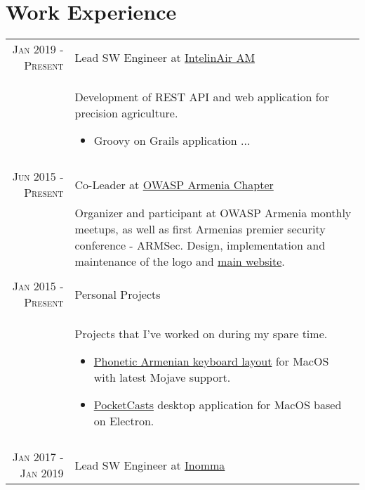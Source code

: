\documentclass[a4paper,10pt]{article}
\begin{document}
\section{Work Experience}
\begin{tabular}{r|p{11cm}}

\textsc{Jan 2019 - Present}
  & Lead SW Engineer at
    \href{https://www.intelinair.com/}{IntelinAir AM} \\

& \footnotesize{ Development of REST API and web application for precision agriculture. 

  \begin{itemize}
    \item Groovy on Grails application ...
  \end{itemize}
} \\


\multicolumn{2}{c}{} \\


\textsc{Jun 2015 - Present}
  & Co-Leader at
    \href{https://www.owasp.org/index.php/Armenia}{OWASP Armenia Chapter} \\

  & \footnotesize{
    Organizer and participant at OWASP Armenia monthly meetups, as well as
    first Armenia\textsc{\char13}s premier security conference - ARMSec.
    Design, implementation and maintenance of the logo and
    \href{http://armsec.org/}{main website}.
  } \\


\multicolumn{2}{c}{} \\


\textsc{Jan 2015 - Present}
  & Personal Projects \\
  & \footnotesize{
    Projects that I've worked on during my spare time.
    \begin{itemize}
      \item \href{https://github.com/vahe-evoyan/armenian-phonetic/releases}
        {Phonetic Armenian keyboard layout} for MacOS with latest Mojave
        support.
      \item \href{https://vahe-evoyan.github.io/pocketcasts-desktop/}
        {PocketCasts} desktop application for MacOS based on Electron.
    \end{itemize}
  } \\


\multicolumn{2}{c}{} \\


\textsc{Jan 2017 - Jan 2019}
  & Lead SW Engineer at
    \href{https://www.inomma.com/}{Inomma} \\


\end{tabular}
\end{document}
